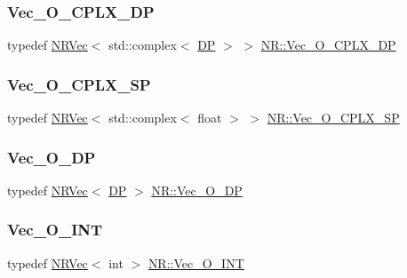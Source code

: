 \mbox{\label{namespaceNR_ace78d6fd6a189eda11ef1f1ec73692d9}} 
\subsubsection{\texorpdfstring{Vec\_O\_CPLX\_DP}{Vec\_O\_CPLX\_DP}}
{\footnotesize\ttfamily typedef \mbox{\hyperlink{classNR_1_1NRVec}{N\+R\+Vec}}$<$ std\+::complex$<$ \mbox{\hyperlink{namespaceNR_af6ff762dd605ff477b8e52387253a02a}{DP}} $>$ $>$ \mbox{\hyperlink{namespaceNR_ace78d6fd6a189eda11ef1f1ec73692d9}{N\+R\+::\+Vec\+\_\+\+O\+\_\+\+C\+P\+L\+X\+\_\+\+DP}}}

\mbox{\label{namespaceNR_a48e7d2833db243f92c964077383c261f}} 
\subsubsection{\texorpdfstring{Vec\_O\_CPLX\_SP}{Vec\_O\_CPLX\_SP}}
{\footnotesize\ttfamily typedef \mbox{\hyperlink{classNR_1_1NRVec}{N\+R\+Vec}}$<$ std\+::complex$<$ float $>$ $>$ \mbox{\hyperlink{namespaceNR_a48e7d2833db243f92c964077383c261f}{N\+R\+::\+Vec\+\_\+\+O\+\_\+\+C\+P\+L\+X\+\_\+\+SP}}}

\mbox{\label{namespaceNR_a970094d23441f8ef6a45282a7eb2103d}} 
\subsubsection{\texorpdfstring{Vec\_O\_DP}{Vec\_O\_DP}}
{\footnotesize\ttfamily typedef \mbox{\hyperlink{classNR_1_1NRVec}{N\+R\+Vec}}$<$ \mbox{\hyperlink{namespaceNR_af6ff762dd605ff477b8e52387253a02a}{DP}} $>$ \mbox{\hyperlink{namespaceNR_a970094d23441f8ef6a45282a7eb2103d}{N\+R\+::\+Vec\+\_\+\+O\+\_\+\+DP}}}

\mbox{\label{namespaceNR_ade2338f6d53b7da3dd6d1c04804541f2}} 
\subsubsection{\texorpdfstring{Vec\_O\_INT}{Vec\_O\_INT}}
{\footnotesize\ttfamily typedef \mbox{\hyperlink{classNR_1_1NRVec}{N\+R\+Vec}}$<$ int $>$ \mbox{\hyperlink{namespaceNR_ade2338f6d53b7da3dd6d1c04804541f2}{N\+R\+::\+Vec\+\_\+\+O\+\_\+\+I\+NT}}}


